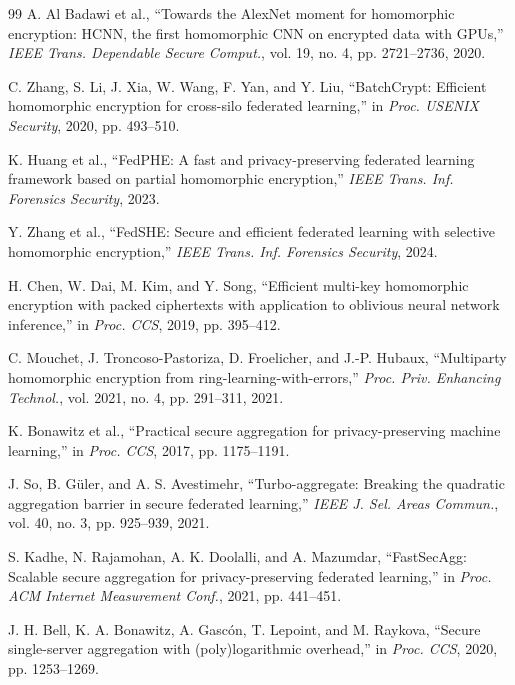\begin{thebibliography}{99}
A. Al Badawi et al., ``Towards the AlexNet moment for homomorphic encryption: HCNN, the first homomorphic CNN on encrypted data with GPUs,'' \textit{IEEE Trans. Dependable Secure Comput.}, vol. 19, no. 4, pp. 2721--2736, 2020.

C. Zhang, S. Li, J. Xia, W. Wang, F. Yan, and Y. Liu, ``BatchCrypt: Efficient homomorphic encryption for cross-silo federated learning,'' in \textit{Proc. USENIX Security}, 2020, pp. 493--510.

K. Huang et al., ``FedPHE: A fast and privacy-preserving federated learning framework based on partial homomorphic encryption,'' \textit{IEEE Trans. Inf. Forensics Security}, 2023.

Y. Zhang et al., ``FedSHE: Secure and efficient federated learning with selective homomorphic encryption,'' \textit{IEEE Trans. Inf. Forensics Security}, 2024.

H. Chen, W. Dai, M. Kim, and Y. Song, ``Efficient multi-key homomorphic encryption with packed ciphertexts with application to oblivious neural network inference,'' in \textit{Proc. CCS}, 2019, pp. 395--412.

C. Mouchet, J. Troncoso-Pastoriza, D. Froelicher, and J.-P. Hubaux, ``Multiparty homomorphic encryption from ring-learning-with-errors,'' \textit{Proc. Priv. Enhancing Technol.}, vol. 2021, no. 4, pp. 291--311, 2021.

K. Bonawitz et al., ``Practical secure aggregation for privacy-preserving machine learning,'' in \textit{Proc. CCS}, 2017, pp. 1175--1191.

J. So, B. G\"{u}ler, and A. S. Avestimehr, ``Turbo-aggregate: Breaking the quadratic aggregation barrier in secure federated learning,'' \textit{IEEE J. Sel. Areas Commun.}, vol. 40, no. 3, pp. 925--939, 2021.

S. Kadhe, N. Rajamohan, A. K. Doolalli, and A. Mazumdar, ``FastSecAgg: Scalable secure aggregation for privacy-preserving federated learning,'' in \textit{Proc. ACM Internet Measurement Conf.}, 2021, pp. 441--451.

J. H. Bell, K. A. Bonawitz, A. Gasc\'{o}n, T. Lepoint, and M. Raykova, ``Secure single-server aggregation with (poly)logarithmic overhead,'' in \textit{Proc. CCS}, 2020, pp. 1253--1269.


\end{thebibliography}
